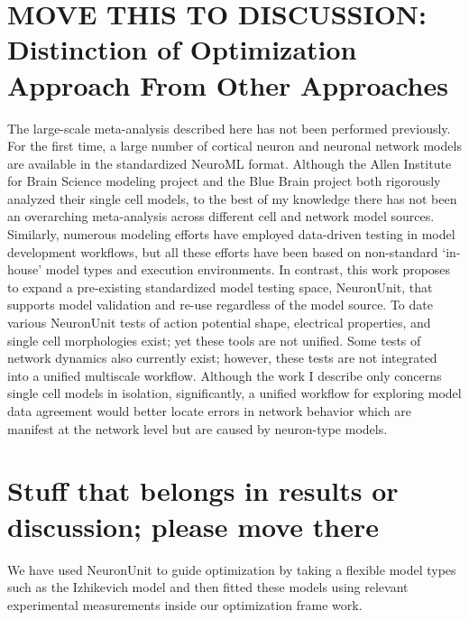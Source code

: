 \section{MOVE THIS TO DISCUSSION: Distinction of Optimization Approach From Other Approaches}
The large-scale meta-analysis described here has not been performed previously. For the first time, a large number of cortical neuron and neuronal network models are available in the standardized NeuroML format. Although the Allen Institute for Brain Science modeling project and the Blue Brain project both rigorously analyzed their single cell models, to the best of my knowledge there has not been an overarching meta-analysis across different cell and network model sources.\\

Similarly, numerous modeling efforts have employed data-driven testing in model development workflows, but all these efforts have been based on non-standard ‘in-house’ model types and execution environments. In contrast, this work proposes to expand a pre-existing standardized model testing space, NeuronUnit, that supports model validation and re-use regardless of the model source. To date various NeuronUnit tests of action potential shape, electrical properties, and single cell morphologies exist; yet these tools are not unified. Some tests of network dynamics also currently exist; however, these tests are not integrated into a unified multiscale workflow. Although the work I describe only concerns single cell models in isolation, significantly, a unified workflow for exploring model data agreement would better locate errors in network behavior which are manifest at the network level but are caused by neuron-type models.

\section{Stuff that belongs in results or discussion; please move there}%
We have used NeuronUnit to guide optimization by taking a flexible model types such as the Izhikevich model and then fitted these models using relevant experimental measurements inside our optimization frame work.


